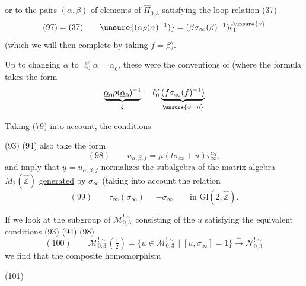 
or to the pairs $(\alpha,\beta)$ of elements of $\widehat{\Pi}_{0,3}$
satisfying the loop relation (37)
\[
 (97)=(37)\qquad
 \unsure{(\alpha\rho(\alpha)^{-1})}
 =(\beta\sigma_\infty(\beta)^{-1})\ell_1^{\unsure{\nu}}
\]
(which we will then complete by taking $f=\beta$).


Up to changing $\alpha$ to $\ell_0^\nu\alpha=\underline{\alpha}_0$,
these were the conventions of  (where the formula
 takes the form
\[
 \underbrace{\underline{\alpha}_0\rho(\underline{\alpha}_0)^{-1}}_{\xi}
 =\ell_0^\nu
 \underbrace{(f\sigma_\infty(f)^{-1})}_{\unsure{\varphi=\eta}}
\]

Taking (79) into account, the conditions


(93) (94) also take the form
\[
 (98)\qquad u_{\alpha,\beta,f}
 =\mu(t\sigma_\infty+u)\tau_\infty^{\alpha_2},
\]
and imply that $\underline{u}=u_{\alpha,\beta,f}$
 normalizes the subalgebra of the matrix algebra
$M_2(\widehat{\mathbb Z})$ \uline{generated} by $\sigma_\infty$
(taking into account the relation
\[
 (99)\qquad \tau_\infty(\sigma_\infty)=-\sigma_\infty
 \qquad\text{in }\mathrm{Gl}(2,\widehat{\mathbb Z}).
\]

If we look at the subgroup of $\mathcal M_{0,3}^{!\sim}$
consisting of the $u$ satisfying the equivalent conditions (93) (94) (98)
\[
 (100)\qquad
 \mathcal M_{0,3}^{!\sim}\left(\tfrac12\right)
 =
 \{u\in\mathcal M_{0,3}^{!\sim}\mid [u,\sigma_\infty]=1\}
 \overset{\sim}{\longrightarrow}\mathcal N_{0,3}^{!\sim}
\]
we find that the composite homomorphism


\begin{samepage}
(101)
\end{samepage}

